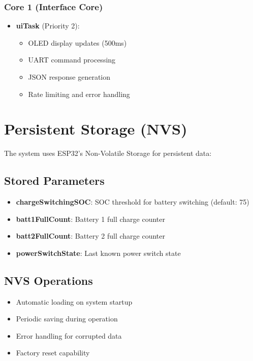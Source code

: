 \documentclass[11pt,a4paper]{article}
\begin{document}
\subsubsection{Core 1 (Interface Core)}
\begin{itemize}
    \item \textbf{uiTask} (Priority 2):
    \begin{itemize}
        \item OLED display updates (500ms)
        \item UART command processing
        \item JSON response generation
        \item Rate limiting and error handling
    \end{itemize}
\end{itemize}

\section{Persistent Storage (NVS)}

The system uses ESP32's Non-Volatile Storage for persistent data:

\subsection{Stored Parameters}
\begin{itemize}
    \item \textbf{chargeSwitchingSOC}: SOC threshold for battery switching (default: 75)
    \item \textbf{batt1FullCount}: Battery 1 full charge counter
    \item \textbf{batt2FullCount}: Battery 2 full charge counter
    \item \textbf{powerSwitchState}: Last known power switch state
\end{itemize}

\subsection{NVS Operations}
\begin{itemize}
    \item Automatic loading on system startup
    \item Periodic saving during operation
    \item Error handling for corrupted data
    \item Factory reset capability
\end{itemize}
\end{document}
